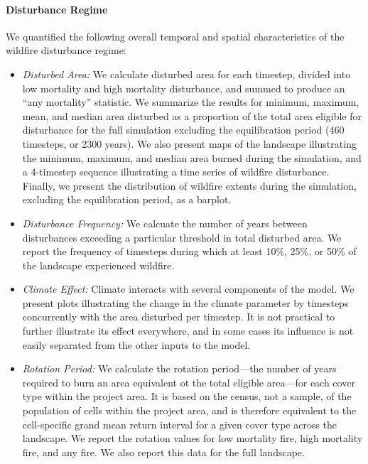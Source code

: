 \paragraph{Disturbance Regime} We quantified the following overall temporal and spatial characteristics of the wildfire disturbance regime:
\begin{itemize}
	\item \emph{Disturbed Area:} We calculate disturbed area for each timestep, divided into low mortality and high mortality disturbance, and summed to produce an ``any mortality'' statistic. We summarize the results for minimum, maximum, mean, and median area disturbed as a proportion of the total area eligible for disturbance for the full simulation excluding the equilibration period (460 timesteps, or 2300 years). We also present maps of the landscape illustrating the minimum, maximum, and median area burned during the simulation, and a 4-timestep sequence illustrating a time series of wildfire disturbance. Finally, we present the distribution of wildfire extents during the simulation, excluding the equilibration period, as a barplot.
	\item \emph{Disturbance Frequency:} We calcuate the number of years between disturbances exceeding a particular threshold in total disturbed area. We report the frequency of timesteps during which at least 10\%, 25\%, or 50\% of the landscape experienced wildfire.
	\item \emph{Climate Effect:} Climate interacts with several components of the model. We present plots illustrating the change in the climate parameter by timesteps concurrently with the area disturbed per timestep. It is not practical to further illustrate its effect everywhere, and in some cases its influence is not easily separated from the other inputs to the model.  
	\item \emph{Rotation Period:} We calculate the rotation period---the number of years required to burn an area equivalent ot the total eligible area---for each cover type within the project area. It is based on the census, not a sample, of the population of cells within the project area, and is therefore equivalent to the cell-specific grand mean return interval for a given cover type across the landscape. We report the rotation values for low mortality fire, high mortality fire, and any fire. We also report this data for the full landscape.

\end{itemize}
